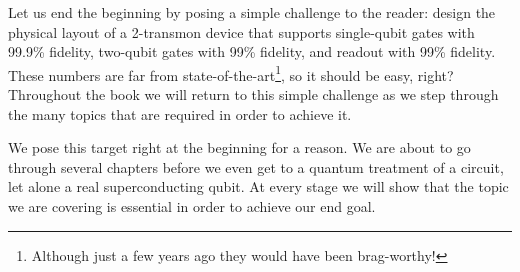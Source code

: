 
Let us end the beginning by posing a simple challenge to the reader: design the physical layout of a 2-transmon device that supports single-qubit gates with 99.9\% fidelity, two-qubit gates with 99\% fidelity, and readout with 99\% fidelity. These numbers are far from state-of-the-art\footnote{Although just a few years ago they would have been brag-worthy!}, so it should be easy, right? Throughout the book we will return to this simple challenge as we step through the many topics that are required in order to achieve it.

We pose this target right at the beginning for a reason.
We are about to go through several chapters before we even get to a quantum treatment of a circuit, let alone a real superconducting qubit.
At every stage we will show that the topic we are covering is essential in order to achieve our end goal.

